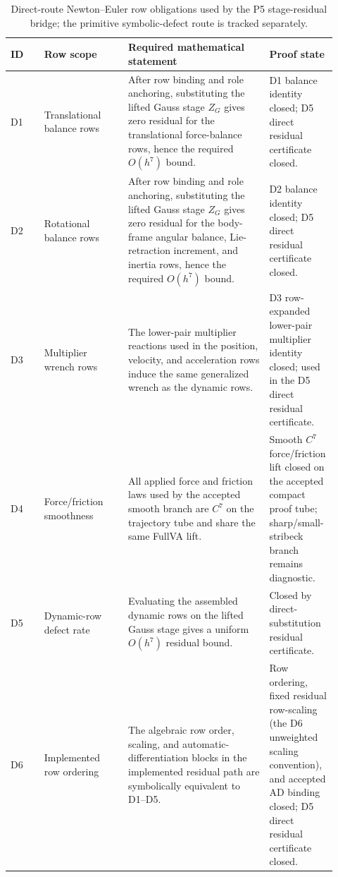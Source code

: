 \documentclass[preprint,12pt]{elsarticle}
\begin{document}
\begin{table}[htbp]
\centering
\caption{Direct-route Newton--Euler row obligations used by the P5 stage-residual bridge; the primitive symbolic-defect route is tracked separately.}
\label{tab:newton-euler-obligations}
\scriptsize
\setlength{\tabcolsep}{3pt}
\renewcommand{\arraystretch}{0.90}
\begin{tabular}{P{0.10\linewidth}P{0.25\linewidth}P{0.42\linewidth}P{0.15\linewidth}}
\toprule
ID & Row scope & Required mathematical statement & Proof state \\
\midrule
D1 & Translational balance rows &
After row binding and role anchoring, substituting the lifted Gauss stage
\(Z_G\) gives zero residual for the translational force-balance rows, hence
the required \(O(h^7)\) bound. & D1 balance identity closed; D5 direct residual certificate closed. \\
D2 & Rotational balance rows &
After row binding and role anchoring, substituting the lifted Gauss stage
\(Z_G\) gives zero residual for the body-frame angular balance, Lie-retraction
increment, and inertia rows, hence the required \(O(h^7)\) bound. &
D2 balance identity closed; D5 direct residual certificate closed. \\
D3 & Multiplier wrench rows &
The lower-pair multiplier reactions used in the position, velocity, and
acceleration rows induce the same generalized wrench as the dynamic rows. &
D3 row-expanded lower-pair multiplier identity closed; used in the D5 direct
residual certificate. \\
D4 & Force/friction smoothness &
All applied force and friction laws used by the accepted smooth branch are
$C^7$ on the trajectory tube and share the same FullVA lift. &
Smooth $C^7$ force/friction lift closed on the accepted compact proof tube;
sharp/small-stribeck branch remains diagnostic. \\
D5 & Dynamic-row defect rate &
Evaluating the assembled dynamic rows on the lifted Gauss stage gives a
uniform $O(h^7)$ residual bound. & Closed by direct-substitution residual
certificate. \\
D6 & Implemented row ordering &
The algebraic row order, scaling, and automatic-differentiation blocks in the
implemented residual path are symbolically equivalent to D1--D5. &
Row ordering, fixed residual row-scaling (the D6 unweighted scaling
convention), and accepted AD binding closed;
D5 direct residual certificate closed. \\
\bottomrule
\end{tabular}
\end{table}
\end{document}
